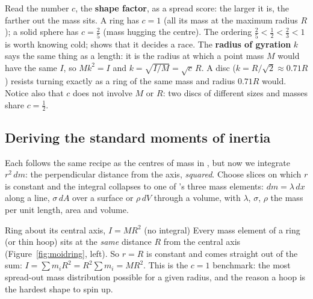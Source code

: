Read the number $c$, the \textbf{shape factor}, as a spread score: the larger it is, the farther out the mass sits. A ring has $c=1$
(all its mass at the maximum radius $R$); a solid sphere has $c=\tfrac{2}{5}$ (mass hugging the centre). The
ordering $\tfrac{2}{5}<\tfrac{1}{2}<\tfrac{2}{3}<1$ is worth knowing cold;  shows that it decides a race.
The \textbf{radius of gyration} $k$ says the same thing as a length: it is the radius at which a point mass $M$
would have the same $I$, so $Mk^2=I$ and $k=\sqrt{I/M}=\sqrt{c}\,R$. A disc
($k=R/\sqrt2\approx0.71R$) resists turning exactly as a ring of the same mass and radius $0.71R$ would.
Notice also that $c$ does not involve $M$ or $R$: two discs of different sizes and masses share $c=\tfrac12$.

\subsection{Deriving the standard moments of inertia}

Each follows the same recipe as the centres of mass in , but now we integrate $r^2\,dm$: the perpendicular
distance from the axis, \emph{squared}. Choose slices on which $r$ is constant and the integral collapses
to one of 's three mass elements: $dm=\lambda\,dx$ along a line, $\sigma\,dA$ over a surface or $\rho\,dV$ through a volume, with $\lambda$, $\sigma$, $\rho$ the mass per unit length, area and volume.

\begin{derivbox}{Ring about its central axis, $I=MR^2$ (no integral)}
Every mass element of a ring (or thin hoop) sits at the \emph{same} distance $R$ from the central axis
(Figure~\ref{fig:moidring}, left).
So $r=R$ is constant and comes straight out of the sum: $I=\sum m_i R^2=R^2\sum m_i=MR^2$. This is the
$c=1$ benchmark: the most spread-out mass distribution possible for a given radius, and the reason a
hoop is the hardest shape to spin up.
\end{derivbox}

\begin{figure}[htbp]
\centering
{}
\end{figure}

